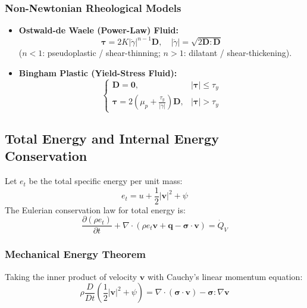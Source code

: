 \documentclass[11pt,a4paper]{article}
\begin{document}
\subsubsection{Non-Newtonian Rheological Models}
\begin{itemize}[leftmargin=*]
    \item \textbf{Ostwald-de Waele (Power-Law) Fluid:}
    \begin{equation}
    \boldsymbol{\tau} = 2 K |\dot{\gamma}|^{n-1} \mathbf{D}, \quad |\dot{\gamma}| = \sqrt{2 \mathbf{D} : \mathbf{D}}
    \end{equation}
    ($n < 1$: pseudoplastic / shear-thinning; $n > 1$: dilatant / shear-thickening).
    \item \textbf{Bingham Plastic (Yield-Stress Fluid):}
    \begin{equation}
    \begin{cases} \mathbf{D} = \mathbf{0}, & |\boldsymbol{\tau}| \le \tau_y \\ \boldsymbol{\tau} = 2 \left( \mu_p + \frac{\tau_y}{|\dot{\gamma}|} \right) \mathbf{D}, & |\boldsymbol{\tau}| > \tau_y \end{cases}
    \end{equation}
\end{itemize}

\subsection{Total Energy and Internal Energy Conservation}

Let $e_t$ be the total specific energy per unit mass:
\begin{equation}
e_t = u + \frac{1}{2} |\mathbf{v}|^2 + \psi
\end{equation}
The Eulerian conservation law for total energy is:
\begin{equation}
\frac{\partial (\rho e_t)}{\partial t} + \nabla \cdot \left( \rho e_t \mathbf{v} + \mathbf{q} - \boldsymbol{\sigma} \cdot \mathbf{v} \right) = \dot{Q}_V
\end{equation}

\subsubsection{Mechanical Energy Theorem}
Taking the inner product of velocity $\mathbf{v}$ with Cauchy's linear momentum equation:
\begin{equation}
\rho \frac{D}{Dt}\left( \frac{1}{2}|\mathbf{v}|^2 + \psi \right) = \nabla \cdot (\boldsymbol{\sigma} \cdot \mathbf{v}) - \boldsymbol{\sigma} : \nabla \mathbf{v}
\end{equation}
\end{document}
